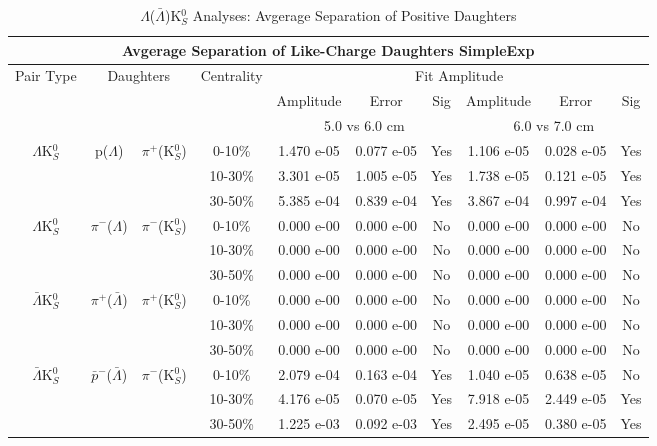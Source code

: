 \documentclass[../AnalysisNoteJBuxton.tex]{subfiles}
\begin{document}
\begin{table}
 \centering
 \begin{tabular}{|c|c|c|c|c|c|c||c|c|c|}
 \multicolumn{10}{c}{Avgerage Separation of Like-Charge Daughters SimpleExp} \\
  \hline
  \multirow{3}{*}{Pair Type} & \multicolumn{2}{c|}{\multirow{3}{*}{Daughters}} & \multirow{3}{*}{Centrality} & \multicolumn{6}{c|}{Fit Amplitude} \\
  \cline{5-10}
   & \multicolumn{2}{c|}{} & & Amplitude & Error & Sig & Amplitude & Error & Sig \\  
  \cline{5-10}
   & \multicolumn{2}{c|}{} & & \multicolumn{3}{c||}{5.0 vs 6.0 cm} & \multicolumn{3}{c|}{6.0 vs 7.0 cm} \\  
  \hline
  \multirow{3}{*}{$\Lambda$K$^{0}_{S}$} & \multirow{3}{*}{p($\Lambda$)} & \multirow{3}{*}{$\pi^{+}$(K$^{0}_{S}$)}
   &      0-10\% & 1.470 e-05 & 0.077 e-05 & Yes & 1.106 e-05 & 0.028 e-05 & Yes\\
   & & & 10-30\% & 3.301 e-05 & 1.005 e-05 & Yes & 1.738 e-05 & 0.121 e-05 & Yes \\
   & & & 30-50\% & 5.385 e-04 & 0.839 e-04 & Yes & 3.867 e-04 & 0.997 e-04 & Yes \\
  \hline
  \multirow{3}{*}{$\Lambda$K$^{0}_{S}$} & \multirow{3}{*}{$\pi^{-}$($\Lambda$)} & \multirow{3}{*}{$\pi^{-}$(K$^{0}_{S}$) }
   &      0-10\% & 0.000 e-00 & 0.000 e-00 & No & 0.000 e-00 & 0.000 e-00 & No \\
   & & & 10-30\% & 0.000 e-00 & 0.000 e-00 & No & 0.000 e-00 & 0.000 e-00 & No \\
   & & & 30-50\% & 0.000 e-00 & 0.000 e-00 & No & 0.000 e-00 & 0.000 e-00 & No \\
  \hline \hline
  \multirow{3}{*}{$\bar{\Lambda}$K$^{0}_{S}$} & \multirow{3}{*}{$\pi^{+}$($\bar{\Lambda}$)} & \multirow{3}{*}{$\pi^{+}$(K$^{0}_{S}$)} 
   &      0-10\% & 0.000 e-00 & 0.000 e-00 & No & 0.000 e-00 & 0.000 e-00 & No \\
   & & & 10-30\% & 0.000 e-00 & 0.000 e-00 & No & 0.000 e-00 & 0.000 e-00 & No \\
   & & & 30-50\% & 0.000 e-00 & 0.000 e-00 & No & 0.000 e-00 & 0.000 e-00 & No \\
  \hline
  \multirow{3}{*}{$\bar{\Lambda}$K$^{0}_{S}$} & \multirow{3}{*}{$\bar{p}^{-}$($\bar{\Lambda}$)} & \multirow{3}{*}{$\pi^{-}$(K$^{0}_{S}$)}
   &      0-10\% & 2.079 e-04 & 0.163 e-04 & Yes & 1.040 e-05 & 0.638 e-05 & No \\
   & & & 10-30\% & 4.176 e-05 & 0.070 e-05 & Yes & 7.918 e-05 & 2.449 e-05 & Yes \\
   & & & 30-50\% & 1.225 e-03 & 0.092 e-03 & Yes & 2.495 e-05 & 0.380 e-05 & Yes \\
  \hline
 \end{tabular}
 \caption{$\Lambda$($\bar{\Lambda}$)K$^{0}_{S}$ Analyses: Avgerage Separation of Positive Daughters}
 \label{tab:AvgSepLamK0_SimpleExp}
\end{table}
\end{document}
